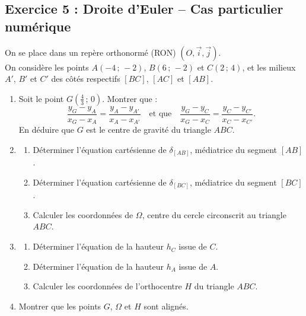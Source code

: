 \documentclass[11pt,a4paper]{article}
\begin{document}
\newpage
\subsection*{Exercice 5 : Droite d'Euler -- Cas particulier numérique}

\begin{enoncebox}
On se place dans un repère orthonormé (RON) $(O, \vec{i}, \vec{j})$.\\
On considère les points $A(-4\,;\,-2)$, $B(6\,;\,-2)$ et $C(2\,;\,4)$, et les milieux $A'$, $B'$ et $C'$ des côtés respectifs $[BC]$, $[AC]$ et $[AB]$.
\begin{enumerate}
    \item Soit le point $G\left(\frac{4}{3}\,;\,0\right)$.
    Montrer que :
    \[
    \frac{y_G - y_A}{x_G - x_A} = \frac{y_A - y_{A'}}{x_A - x_{A'}} \quad \text{et que} \quad \frac{y_G - y_C}{x_G - x_C} = \frac{y_C - y_{C'}}{x_C - x_{C'}}.
    \]
    En déduire que $G$ est le centre de gravité du triangle $ABC$.
    \item 
    \begin{enumerate}
        \item Déterminer l'équation cartésienne de $\delta_{[AB]}$, médiatrice du segment $[AB]$.
        \item Déterminer l'équation cartésienne de $\delta_{[BC]}$, médiatrice du segment $[BC]$.
        \item Calculer les coordonnées de $\Omega$, centre du cercle circonscrit au triangle $ABC$.
    \end{enumerate}
    \item 
    \begin{enumerate}
        \item Déterminer l'équation de la hauteur $h_C$ issue de $C$.
        \item Déterminer l'équation de la hauteur $h_A$ issue de $A$.
        \item Calculer les coordonnées de l'orthocentre $H$ du triangle $ABC$.
    \end{enumerate}
    \item Montrer que les points $G$, $\Omega$ et $H$ sont alignés.
\end{enumerate}
\end{enoncebox}
\end{document}
